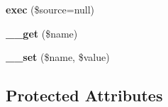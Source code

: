 \begin{DoxyCompactItemize}
\item 
\hypertarget{classQuery_abc6101919844b77e79374701db23854a}{
{\bfseries exec} (\$source=null)}
\label{classQuery_abc6101919844b77e79374701db23854a}

\item 
\hypertarget{classQuery_ad6aed5c09535a3e4d711db6d4374deff}{
{\bfseries \_\-\_\-get} (\$name)}
\label{classQuery_ad6aed5c09535a3e4d711db6d4374deff}

\item 
\hypertarget{classQuery_ac753111d5ae37c7134968dfe08413aae}{
{\bfseries \_\-\_\-set} (\$name, \$value)}
\label{classQuery_ac753111d5ae37c7134968dfe08413aae}

\end{DoxyCompactItemize}
\subsection*{Protected Attributes}
